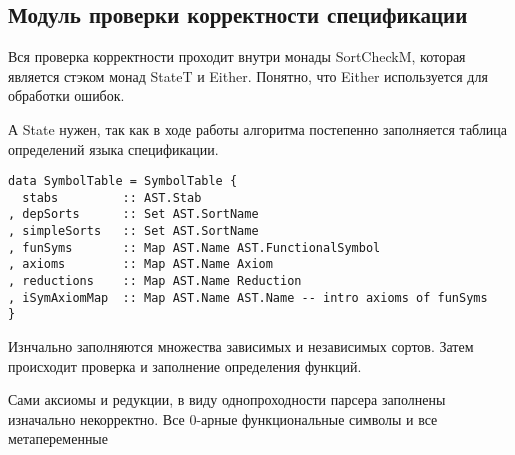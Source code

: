 \subsection{Модуль проверки корректности спецификации}\label{sortcheck}
Вся проверка корректности проходит внутри монады SortCheckM, которая является стэком монад StateT и Either. Понятно, что Either используется для обработки ошибок.

А State нужен, так как в ходе работы алгоритма постепенно заполняется таблица определений языка спецификации.

\begin{lstlisting}[caption={Структура заполняемая модулем проверки спецификации},captionpos=b,frame=single, label={SymTab}]
data SymbolTable = SymbolTable {
  stabs         :: AST.Stab
, depSorts      :: Set AST.SortName
, simpleSorts   :: Set AST.SortName
, funSyms       :: Map AST.Name AST.FunctionalSymbol
, axioms        :: Map AST.Name Axiom
, reductions    :: Map AST.Name Reduction
, iSymAxiomMap  :: Map AST.Name AST.Name -- intro axioms of funSyms
}
\end{lstlisting}

Изнчально заполняются множества зависимых и независимых сортов. Затем происходит проверка и заполнение определения функций.

Сами аксиомы и редукции, в виду однопроходности парсера заполнены изначально некорректно. Все 0-арные функциональные символы и все метапеременные




















